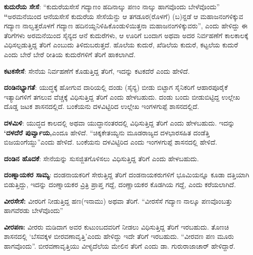 \textbf{ಕುದುರೆಯ ಸೇಸೆ}: “ಕುದುರೆಯಸೇಸೆ ಗದ್ಯಾಣಂ ಹದಿನಾಲ್ಕು ಪಣಂ ನಾಲ್ಕು ಹಾಗವೊಂದು ಬೇಳೆವೊಂದು” \textbf{“}ಅರಮನೆಯಿಂದ ಆನೆಯಸೇಸೆ ಕುದುರೆಯ ಸೇಸೆಯೆನ್ದು ಆ ತಗಡೂರ(ರೊಳಗೆ) (ಬ)ನ್ದಡೆ ಆ ಮಹಾಜನಂಗಳಿಕ್ಕುವ ಗದ್ಯಾಣ ನಾಲ್ವತ್ತರೊಳಗೆ ಗದ್ಯಾಣ ಹದಿನಯ್ದನಿಳಿಹಿಕೊಂಡುಳಿಯಿತ್ತನಾ ಮಹಾಜನಂಗಳಿಕ್ಕುವರು”, ಎಂದು ಹೇಳಿದ್ದು ಈ ತೆರಿಗೆಗಳು ಅರಮನೆಯಿಂದ ಸೈನ್ಯದ ಆನೆ ಕುದುರೆಗಳು, ಆ ಊರಿಗೆ ಬಂದಾಗ ಅಥವಾ ಅದರ ನಿರ್ವಹಣೆಗೆ ಕಾಲಕಾಲಕ್ಕೆ ವಿಧಿಸಲ್ಪಡುತ್ತಿದ್ದ ತೆರಿಗೆ ಎಂಬುದು ತಿಳಿದುಬರುತ್ತದೆ. ಹೊಲೆಯ ಕುದುರೆ, ಖೆಡಿಲೆಯ ಕುದುರೆ, ಕಟ್ಟಲೆಯ ಕುದುರೆ ಎಂದು ಬೇರೆ ಬೇರೆ ರೀತಿಯ ಕುದುರೆಗಳಿಗೆ ತೆರಿಗೆ ಹಾಕಲಾಗಿದೆ.

\textbf{ಕಟಕಸೇಸೆ}: ಸೇನೆಯ ನಿರ್ವಹಣೆಗೆ ಕೊಡುತ್ತಿದ್ದ ತೆರಿಗೆ, ಇದನ್ನು ಕಟಕದೆರೆ ಎಂದು ಹೇಳಿದೆ.

\textbf{ದಂಡಿನಭ್ಯಾಗತೆ}: ಯುದ್ಧಕ್ಕೆ ಹೋಗುವ ದಾರಿಯಲ್ಲಿ ದಂಡು (ಸೈನ್ಯ) ಬೀಡು ಬಿಟ್ಟಾಗ ಸೈನಿಕರಿಗೆ ಆಹಾರಪೂರೈಕೆ ಇತ್ಯಾದಿಗಳಿಗೆ ತಗಲುವ ವೆಚ್ಚಕ್ಕೆ ವಿಧಿಸುತ್ತಿದ್ದ ತೆರಿಗೆ ಎಂದು ಹೇಳಬಹುದು. ದಂಡು ಬಂದು ಬೀಡುಬಿಟ್ಟಿದ್ದ ಉಲ್ಲೇಖ ದೊಡ್ಡ ಜಟಕ ಶಾಸನದಲ್ಲಿದೆ. ಬಂಕೆಯನು ದಳವಿಟ್ಟಿರಿದ ಉಲ್ಲೇಖ ಇಂಗಳಗುಪ್ಪೆ ಶಾಸನದಲ್ಲಿದೆ. 

\textbf{ದಳಮಿಳಿ}: ಯುದ್ಧದ ಕಾಲದಲ್ಲಿ ಅಥವಾ ಯುದ್ಧಾನಂತರದಲ್ಲಿ ವಿಧಿಸುತ್ತಿದ್ದ ತೆರಿಗೆ ಎಂದು ಹೇಳಬಹುದು. ಇದನ್ನು \textbf{‘ದಳದೆರೆ ಪುರ್ವ್ವಾಯ,}ಎಂದೂ ಹೇಳಿದೆ. “ಚಿಕ್ಕಕೇತಯ್ಯನು ಮೂಡರಾಜ್ಯದ ದಳಭಾರಸಹಿತ ದಂಡೆತ್ತಿ ಬಿಜಯಂಗೆಯ್ದು”ಎಂದು ಹೇಳಿದೆ. ಬಂಕೆಯನು ದಳವಿಟ್ಟಿರಿದ ಎಂದು ಇಂಗಳಗುಪ್ಪೆ ಶಾಸನದಲ್ಲಿ ಹೇಳಿದೆ.

\textbf{ದಂಡಿನ ಹೊದಕೆ}: ಸೇನೆಯನ್ನು ಸುಸಜ್ಜಿತಗೊಳಿಸಲು ವಿಧಿಸುತ್ತಿದ್ದ ತೆರಿಗೆ ಎಂದು ಹೇಳಬಹುದು.

\textbf{ದಂಣ್ನಾಯಕರ ಸಾಮ್ಯ}: ದಂಡನಾಯಕರಿಗೆ ಸೇರುತ್ತಿದ್ದ ತೆರಿಗೆ ದಂಡನಾಯಕರುಗಳಿಗೆ ಭೂಮಿಯನ್ನೂ ಕೂಡಾ ದತ್ತಿಯಾಗಿ ಬಿಡುತ್ತಿದ್ದು, ಇದನ್ನು ದಂಣ್ನಾಯಕರ ವ್ರಿತ್ರಿ ಪ್ರಾಪ್ತ ಗದ್ದೆ, ದಂಣ್ಣಾಯಕರ ಕೊಡಗಿಯ ಗದ್ದೆ, ಎಂದು ಕರೆಯಲಾಗಿದೆ.

\textbf{ವೀರಸೇಸೆ:} ವೀರರಿಗೆ ನೀಡುತ್ತಿದ್ದ ಹಣ(ಇನಾಮು) ಅಥವಾ ತೆರಿಗೆ. “ವೀರಸೆಸೆ ಗದ್ಯಾಣ ನಾಲ್ಕೂ ಪಣವೊಂಬತ್ತು ಹಾಗವೆರಡು ಬೇಳೆವೊಂದು”

\textbf{ವೀರಪಣ: } ವೀರರು ಮಡಿದಾಗ ಅವರ ಕುಟುಂಬದವರಿಗೆ ನೀಡಲು ವಿಧಿಸುತ್ತಿದ್ದ ತೆರಿಗೆ ಇರಬಹುದು. ತೊಣಚಿ ಶಾಸನದಲ್ಲಿ ‘ಬೆಸವಕ್ಕಳ ಬೀರವಣಾವೃತ್ತಿ’ಎಂದು ಹೇಳಿದ್ದು ಇದೇ ತೆರಿಗೆ ಇರಬಹುದು. “ವೀರವಣ ಪಣ ಮೂರು ಹಾಗವೊಂದು”. ಬೀರವಣಾವೃತ್ತಿಯು ವೀಳ್ಯದೆಲೆಯ ಮೇಲಿನ ತೆರಿಗೆ ಎಂದು ಡಾ. ಗುರುರಾಜಾಚಾರ್​ ಹೇಳಿದ್ದಾರೆ.


